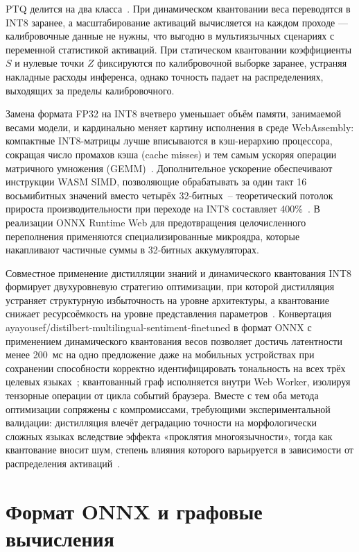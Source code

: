 PTQ делится на два класса~\cite{gholami2021quantization}. При динамическом квантовании веса переводятся в INT8 заранее, а масштабирование активаций вычисляется на каждом проходе — калибровочные данные не нужны, что выгодно в мультиязычных сценариях с переменной статистикой активаций. При статическом квантовании коэффициенты $S$ и нулевые точки $Z$ фиксируются по калибровочной выборке заранее, устраняя накладные расходы инференса, однако точность падает на распределениях, выходящих за пределы калибровочного.

Замена формата FP32 на INT8 вчетверо уменьшает объём памяти, занимаемой весами модели, и кардинально меняет картину исполнения в среде WebAssembly: компактные INT8-матрицы лучше вписываются в кэш-иерархию процессора, сокращая число промахов кэша (cache misses) и тем самым ускоряя операции матричного умножения (GEMM)~\cite{jia2024empowering}. Дополнительное ускорение обеспечивают инструкции WASM SIMD, позволяющие обрабатывать за один такт 16 восьмибитных значений вместо четырёх 32-битных~– теоретический потолок прироста производительности при переходе на INT8 составляет 400\%~\cite{jia2024empowering}. В реализации ONNX Runtime Web для предотвращения целочисленного переполнения применяются специализированные микроядра, которые накапливают частичные суммы в 32-битных аккумуляторах.

Совместное применение дистилляции знаний и динамического квантования INT8 формирует двухуровневую стратегию оптимизации, при которой дистилляция устраняет структурную избыточность на уровне архитектуры, а квантование снижает ресурсоёмкость на уровне представления параметров~\cite{tang2024transformer}. Конвертация ayayousef/distilbert-multilingual-sentiment-finetuned в формат ONNX с применением динамического квантования весов позволяет достичь латентности менее 200~мс на одно предложение даже на мобильных устройствах при сохранении способности корректно идентифицировать тональность на всех трёх целевых языках~\cite{wang2024anatomizing}; квантованный граф исполняется внутри Web Worker, изолируя тензорные операции от цикла событий браузера. Вместе с тем оба метода оптимизации сопряжены с компромиссами, требующими экспериментальной валидации: дистилляция влечёт деградацию точности на морфологически сложных языках вследствие эффекта «проклятия многоязычности», тогда как квантование вносит шум, степень влияния которого варьируется в зависимости от распределения активаций~\cite{xu2022survey}.

\section{Формат ONNX и графовые вычисления} \label{sec:формат_onnx_и_графовые_вычисления}

